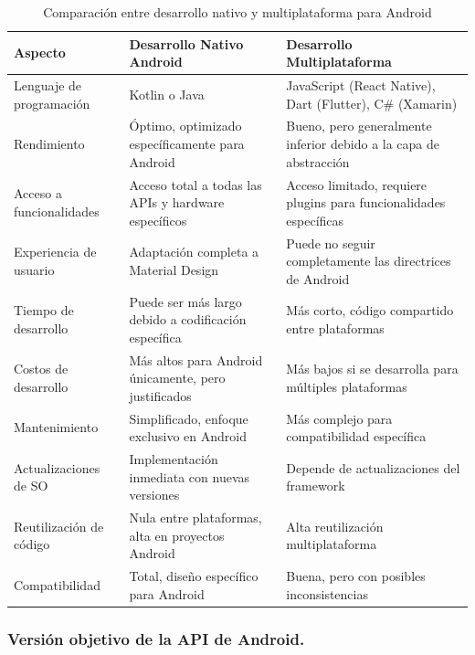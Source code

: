\begin{table}[ht]
\centering
\caption{Comparación entre desarrollo nativo y multiplataforma para Android}
\label{tab:comparacion_nativo_multiplataforma}
\begin{tabular}{|p{}|p{}|p{}|}
\hline
\textbf{Aspecto}{\cellcolor[gray]{0.9}} & \textbf{Desarrollo Nativo Android}{\cellcolor[gray]{0.9}} & \textbf{Desarrollo Multiplataforma}{\cellcolor[gray]{0.9}} \\
\hline
Lenguaje de programación & Kotlin o Java & JavaScript (React Native), Dart (Flutter), C\# (Xamarin) \\
\hline
Rendimiento & Óptimo, optimizado específicamente para Android & Bueno, pero generalmente inferior debido a la capa de abstracción \\
\hline
Acceso a funcionalidades & Acceso total a todas las APIs y hardware específicos & Acceso limitado, requiere plugins para funcionalidades específicas \\
\hline
Experiencia de usuario & Adaptación completa a Material Design & Puede no seguir completamente las directrices de Android \\
\hline
Tiempo de desarrollo & Puede ser más largo debido a codificación específica & Más corto, código compartido entre plataformas \\
\hline
Costos de desarrollo & Más altos para Android únicamente, pero justificados & Más bajos si se desarrolla para múltiples plataformas \\
\hline
Mantenimiento & Simplificado, enfoque exclusivo en Android & Más complejo para compatibilidad específica \\
\hline
Actualizaciones de SO & Implementación inmediata con nuevas versiones & Depende de actualizaciones del framework \\
\hline
Reutilización de código & Nula entre plataformas, alta en proyectos Android & Alta reutilización multiplataforma \\
\hline
Compatibilidad & Total, diseño específico para Android & Buena, pero con posibles inconsistencias \\
\hline
\end{tabular}
\end{table}

\subsubsection{Versión objetivo de la API de Android.}


